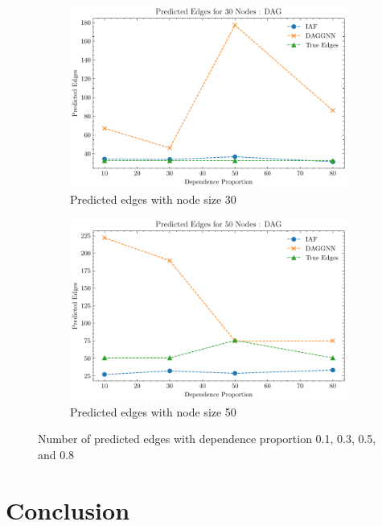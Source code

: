 \documentclass[10pt]{article}
\begin{document}
\begin{figure}
\begin{subfigure}{0.45\textwidth}
        \includegraphics[width=\textwidth]{fig/Predicted Edges_dependence_30_DAG_threshold0.3.pdf}
        \caption{Predicted edges with node size 30}
        \label{pred_edge_node30}
    \end{subfigure}
    \hfill
    \begin{subfigure}{0.45\textwidth}
        \includegraphics[width=\textwidth]{fig/Predicted Edges_dependence_50_DAG_threshold0.3.pdf}
        \caption{Predicted edges with node size 50}
        \label{pred_edge_node50}
    \end{subfigure}
    \caption{Number of predicted edges with dependence proportion 0.1, 0.3, 0.5, and 0.8}
    \label{pred_edge}
\end{figure}


\section{Conclusion}
\end{document}
